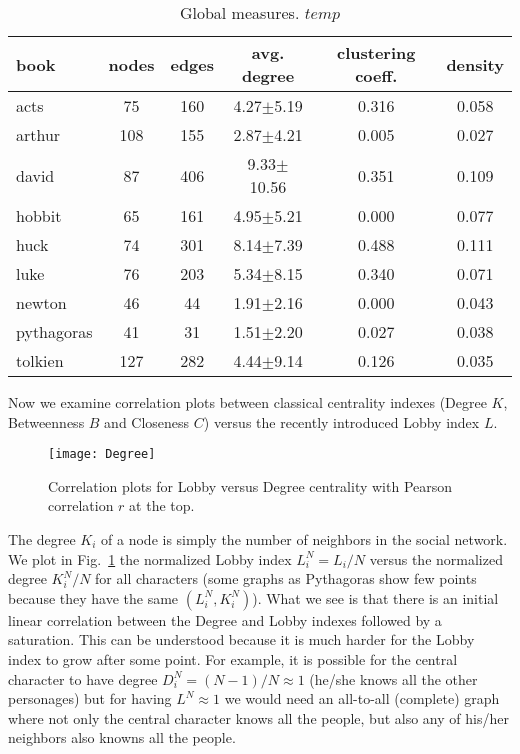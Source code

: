 \documentclass[review]{elsarticle}
\begin{document}
\begin{table}[ht]
\centering\small
{\small\begin{tabular}{l|c|c|c|c|c}\hline
\bf\hfil book\hfil  & \bf\hfil nodes\hfil & \bf\hfil edges\hfil & \bf\hfil avg. degree\hfil & \bf\hfil clustering coeff.\hfil & \bf\hfil density\hfil \\ \hline
acts & 75 & 160 & 4.27$\pm$5.19 & 0.316 & 0.058\\ 
arthur & 108 & 155 & 2.87$\pm$4.21 & 0.005 & 0.027\\ 
david & 87 & 406 & 9.33$\pm$10.56 & 0.351 & 0.109\\ 
hobbit & 65 & 161 & 4.95$\pm$5.21 & 0.000 & 0.077\\ 
huck & 74 & 301 & 8.14$\pm$7.39 & 0.488 & 0.111\\ 
luke & 76 & 203 & 5.34$\pm$8.15 & 0.340 & 0.071\\ 
newton & 46 & 44 & 1.91$\pm$2.16 & 0.000 & 0.043\\ 
pythagoras & 41 & 31 & 1.51$\pm$2.20 & 0.027 & 0.038\\ 
tolkien & 127 & 282 & 4.44$\pm$9.14 & 0.126 & 0.035\\ 
\hline\end{tabular}}
\caption{Global measures. $temp$ }
\label{tab:global}
\end{table}

Now we examine correlation plots between classical centrality indexes
(Degree $K$, Betweenness $B$ and Closeness $C$)
versus the recently introduced Lobby index $L$.

\begin{figure}[ht]
\centering
\texttt{[image: Degree]}
\caption{\label{FigD} Correlation plots 
for Lobby versus Degree centrality 
with Pearson correlation $r$ at the top.}
\end{figure}

The degree  $K_i$ of a node  is simply the 
number of neighbors in the
social network. We plot in Fig.~\ref{FigD} the normalized 
Lobby index $L^N_i = L_i/N$ versus the normalized 
degree $K^N_i/N$ for all characters (some graphs as Pythagoras 
show few points because they have the same $(L^N_i,K^N_i)$).
What we see is that there is an initial linear
correlation between the Degree and Lobby indexes followed by
a saturation. This can be understood because it is much harder
for the Lobby index to grow after some point. For example,
it is possible for the central character 
to have degree $D^N_i=(N-1)/N \approx 1$
(he/she knows all the other personages) but for having
$L^N \approx 1$ we would need an all-to-all (complete) graph
where not only the central character knows all the people,
but also any of his/her neighbors also knowns all the people.
\end{document}
